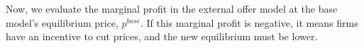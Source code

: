 \documentclass[12pt]{article}
\begin{document}
Now, we evaluate the marginal profit in the external offer model at the base model's equilibrium price, $p^{base}$. If this marginal profit is negative, it means firms have an incentive to cut prices, and the new equilibrium must be lower.
    
    

\end{document}
